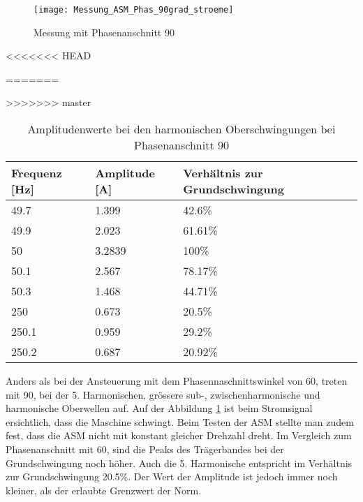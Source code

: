 \begin{figure}[ht!]
	\centering
	\texttt{[image: Messung\_ASM\_Phas\_90grad\_stroeme]}	
	\caption{Messung mit Phasenanschnitt 90\textdegree}\label{fig:Mess_Phas_90grad_stroeme}
\end{figure}
<<<<<<< HEAD
  

=======
 
>>>>>>> master
\begin{table}[ht!]
	\centering
	\begin{tabular}{|l|l|l|}
		\hline
		Frequenz {[}Hz{]} & Amplitude {[}A{]} & Verhältnis zur Grundschwingung	\\ \hline
		49.7              & 1.399             & 42.6\%							\\ \hline
		49.9              & 2.023             & 61.61\%							\\ \hline
		50                & 3.2839            & 100\%							\\ \hline
		50.1              & 2.567             & 78.17\%							\\ \hline
		50.3              & 1.468             & 44.71\%							\\ \hline
		250               & 0.673             & 20.5\%							\\ \hline
		250.1             & 0.959             & 29.2\%							\\ \hline
		250.2             & 0.687             & 20.92\%							\\ \hline
	\end{tabular}
	\caption{Amplitudenwerte bei den harmonischen Oberschwingungen bei Phasenanschnitt 90\textdegree}\label{tab:Phas_90_ASM_stroeme}
\end{table}

Anders als bei der Ansteuerung mit dem Phasennaschnittswinkel von 60\textdegree, treten mit 90\textdegree \hspace{0.02cm}, bei der 5. Harmonischen, grössere sub-, zwischenharmonische und harmonische Oberwellen auf. Auf der Abbildung \ref{fig:Mess_Phas_90grad_stroeme} ist beim Stromsignal ersichtlich, dass die Maschine schwingt. Beim Testen der ASM stellte man zudem fest, dass die ASM nicht mit konstant gleicher Drehzahl dreht.
Im Vergleich zum Phasenanschnitt mit 60\textdegree, sind die Peaks des Trägerbandes bei der Grundschwingung noch höher. Auch die 5. Harmonische entspricht im Verhältnis zur Grundschwingung 20.5\%. Der Wert der Amplitude ist jedoch immer noch kleiner, als der erlaubte Grenzwert der Norm. 


\newpage
